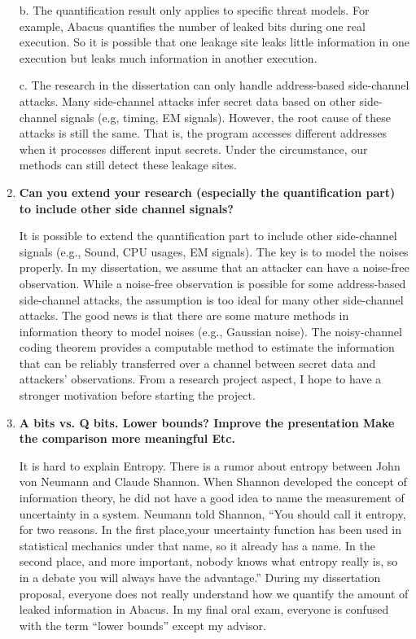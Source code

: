 \documentclass{article}
\begin{document}
\begin{enumerate}
b. The quantification result only applies to specific threat models. For example, Abacus quantifies the number of leaked bits during one real execution. So it is possible that one leakage site leaks little information in one execution but leaks much information in another execution.

c. The research in the dissertation can only handle address-based side-channel attacks. Many side-channel attacks infer secret data based on other side-channel signals (e.g, timing, EM signals). However, the root cause of these attacks is still the same. That is, the program accesses different addresses when it processes different input secrets. Under the circumstance, our methods can still detect these leakage sites.

\item \textbf{Can you extend your research (especially the quantification part) to include other side channel signals?}

It is possible to extend the quantification part to include other side-channel signals (e.g., Sound, CPU usages, EM signals). The key is to model the noises properly. In my dissertation, we assume that an attacker can have a noise-free observation. While a noise-free observation is possible for some address-based side-channel attacks, the assumption is too ideal for many other side-channel attacks. The good news is that there are some mature methods in information theory to model noises (e.g., Gaussian noise). The noisy-channel coding theorem provides a computable method to estimate the information that can be reliably transferred over a channel between secret data and attackers' observations. From a research project aspect, I hope to have a stronger motivation before starting the project. 
\item \textbf{A bits vs. Q bits. Lower bounds?
       Improve the presentation
       Make the comparison more meaningful
       Etc.}

It is hard to explain Entropy. There is a rumor about entropy between John von Neumann and Claude Shannon. When Shannon developed the concept of information theory, he did not have a good idea to name the measurement of uncertainty in a system. Neumann told Shannon, ``You should call it entropy, for two reasons. In the first place,your uncertainty function has been used in statistical mechanics under that name, so it already has a name. In the second place, and more important, nobody knows what entropy really is, so in a debate you will always have the advantage.'' During my dissertation proposal, everyone does not really understand how we quantify the amount of leaked information in Abacus. In my final oral exam, everyone is confused with the term ``lower bounds'' except my advisor. 


\end{enumerate}
\end{document}

